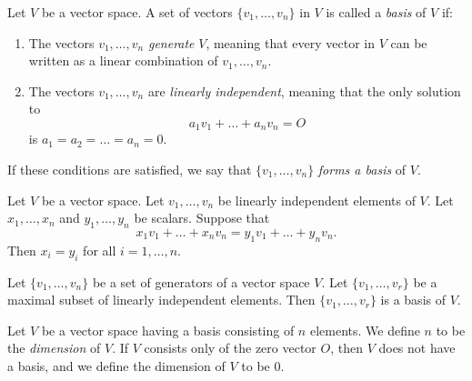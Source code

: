 \documentclass[../main.tex]{subfiles}
\begin{document}
    
    
    
    \begin{definition}[Basis]
        Let $V$ be a vector space. A set of vectors $\{ v_1, \dots, v_n \}$ in $V$ is called a \textit{basis} of $V$ if:
        \begin{enumerate}
            \item The vectors $v_1, \dots, v_n$ \textit{generate} $V$, meaning that every vector in $V$ can be written as a linear combination of $v_1, \dots, v_n$.
            \item The vectors $v_1, \dots, v_n$ are \textit{linearly independent}, meaning that the only solution to 
            \[
            a_1 v_1 + \dots + a_n v_n = O
            \]
            is $a_1 = a_2 = \dots = a_n = 0$.
    \end{enumerate}
        If these conditions are satisfied, we say that $\{ v_1, \dots, v_n \}$ \textit{forms a basis} of $V$.
    \end{definition}
        
    
    
    \begin{theorem}
        Let $V$ be a vector space. Let $v_1, \dots, v_n$ be linearly independent elements of $V$. Let $x_1, \dots, x_n$ and $y_1, \dots, y_n$ be scalars. Suppose that 
        \[
        x_1 v_1 + \dots + x_n v_n = y_1 v_1 + \dots + y_n v_n.
        \]
        Then $x_i = y_i$ for all $i = 1, \dots, n$.
    \end{theorem}
        
    
    
    \begin{theorem}
        Let $\{ v_1, \dots, v_n \}$ be a set of generators of a vector space $V$. Let $\{ v_1, \dots, v_r \}$ be a maximal subset of linearly independent elements. Then $\{ v_1, \dots, v_r \}$ is a basis of $V$.
    \end{theorem}
        
    
    
    
    
    \begin{definition}
        Let $V$ be a vector space having a basis consisting of $n$ elements. We define $n$ to be the \textit{dimension} of $V$. If $V$ consists only of the zero vector $O$, then $V$ does not have a basis, and we define the dimension of $V$ to be $0$.
    \end{definition}
        
    
    
\end{document}
